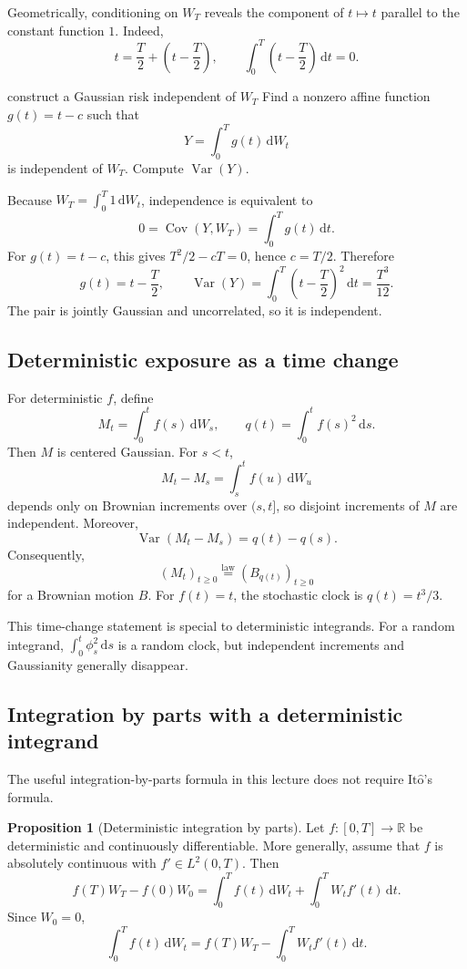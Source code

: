 \documentclass[10pt]{article}
\newcommand{\R}{\mathbb R}
\newcommand{\1}{\mathbf 1}
\newcommand{\dd}{\,\mathrm d}
\newcommand{\Ito}{\mathrm{It\hat{o}}}
\DeclareMathOperator{\Var}{Var}
\DeclareMathOperator{\Cov}{Cov}
\theoremstyle{definition}
\newtheorem{proposition}[definition]{Proposition}
\begin{document}
Geometrically, conditioning on \(W_T\) reveals the component of
\(t\mapsto t\) parallel to the constant function \(1\). Indeed,
\[
t=\frac{T}{2}+\left(t-\frac{T}{2}\right),
\qquad
\int_0^T\left(t-\frac{T}{2}\right)\dd t=0.
\]

\begin{studentexercise}{construct a Gaussian risk independent of \(W_T\)}
Find a nonzero affine function \(g(t)=t-c\) such that
\[
Y=\int_0^Tg(t)\dd W_t
\]
is independent of \(W_T\). Compute \(\Var(Y)\).
\end{studentexercise}

\begin{shortsolution}
Because \(W_T=\int_0^T1\dd W_t\), independence is equivalent to
\[
0=\Cov(Y,W_T)=\int_0^Tg(t)\dd t.
\]
For \(g(t)=t-c\), this gives \(T^2/2-cT=0\), hence \(c=T/2\). Therefore
\[
g(t)=t-\frac{T}{2},
\qquad
\Var(Y)=\int_0^T\left(t-\frac{T}{2}\right)^2\dd t
=\frac{T^3}{12}.
\]
The pair is jointly Gaussian and uncorrelated, so it is independent.
\end{shortsolution}

\subsection{Deterministic exposure as a time change}

For deterministic \(f\), define
\[
M_t=\int_0^tf(s)\dd W_s,
\qquad
q(t)=\int_0^tf(s)^2\dd s.
\]
Then \(M\) is centered Gaussian. For \(s<t\),
\[
M_t-M_s=\int_s^tf(u)\dd W_u
\]
depends only on Brownian increments over \((s,t]\), so disjoint increments of
\(M\) are independent. Moreover,
\[
\Var(M_t-M_s)=q(t)-q(s).
\]
Consequently,
\[
\boxed{(M_t)_{t\geq0}\overset{\mathrm{law}}=
(B_{q(t)})_{t\geq0}}
\]
for a Brownian motion \(B\). For \(f(t)=t\), the stochastic clock is
\(q(t)=t^3/3\).

This time-change statement is special to deterministic integrands. For a
random integrand, \(\int_0^t\phi_s^2\dd s\) is a random clock, but independent
increments and Gaussianity generally disappear.

\subsection{Integration by parts with a deterministic integrand}

The useful integration-by-parts formula in this lecture does not require
\(\Ito\)'s formula.

\begin{proposition}[Deterministic integration by parts]
Let \(f:[0,T]\to\R\) be deterministic and continuously differentiable. More
generally, assume that \(f\) is absolutely continuous with
\(f'\in L^2(0,T)\). Then
\[
f(T)W_T-f(0)W_0
=\int_0^Tf(t)\dd W_t+\int_0^TW_tf'(t)\dd t.
\]
Since \(W_0=0\),
\[
\boxed{
\int_0^Tf(t)\dd W_t
=f(T)W_T-\int_0^TW_tf'(t)\dd t.}
\]
\end{proposition}
\end{document}
